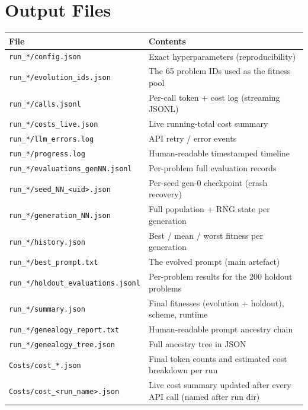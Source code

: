 \documentclass[11pt,a4paper]{report}
\newcommand{\fn}[1]{\texttt{#1}}
\begin{document}
\section{Output Files}

\begin{center}
\begin{tabular}{@{}p{5.5cm}p{6.7cm}@{}}
\toprule
\textbf{File} & \textbf{Contents} \\
\midrule
\fn{run\_*/config.json}              & Exact hyperparameters (reproducibility) \\
\fn{run\_*/evolution\_ids.json}      & The 65 problem IDs used as the fitness pool \\
\fn{run\_*/calls.jsonl}              & Per-call token + cost log (streaming JSONL) \\
\fn{run\_*/costs\_live.json}         & Live running-total cost summary \\
\fn{run\_*/llm\_errors.log}          & API retry / error events \\
\fn{run\_*/progress.log}             & Human-readable timestamped timeline \\
\fn{run\_*/evaluations\_genNN.jsonl} & Per-problem full evaluation records \\
\fn{run\_*/seed\_NN\_\textless uid\textgreater.json} & Per-seed gen-0 checkpoint (crash recovery) \\
\fn{run\_*/generation\_NN.json}      & Full population + RNG state per generation \\
\fn{run\_*/history.json}             & Best / mean / worst fitness per generation \\
\fn{run\_*/best\_prompt.txt}         & The evolved prompt (main artefact) \\
\fn{run\_*/holdout\_evaluations.jsonl} & Per-problem results for the 200 holdout problems \\
\fn{run\_*/summary.json}             & Final fitnesses (evolution + holdout), scheme, runtime \\
\fn{run\_*/genealogy\_report.txt}    & Human-readable prompt ancestry chain \\
\fn{run\_*/genealogy\_tree.json}     & Full ancestry tree in JSON \\
\fn{Costs/cost\_*.json}              & Final token counts and estimated cost breakdown per run \\
\fn{Costs/cost\_\textless run\_name\textgreater.json} & Live cost summary updated after every API call (named after run dir) \\
\bottomrule
\end{tabular}
\end{center}
\end{document}
